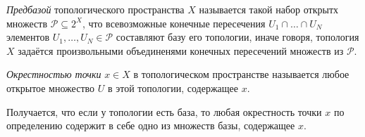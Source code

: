 \begin{to_def}
    \textit{Предбазой} топологического пространства $X$ называется такой набор открытх множеств $\mathcal P \subseteq 2^X$, что всевозможные конечные пересечения $U_1 \cap \ldots \cap U_N$ элементов $U_1, \ldots, U_N \in \mathcal P$ составляют базу его топологии, иначе говоря, топология $X$ задаётся произвольными объединенями конечных пересечений множеств из $\mathcal P$. 
\end{to_def}


\begin{to_def}
    \textit{Окрестностью точки} $x \in X$ в топологическом пространстве называется любое открытое множество $U$ в этой топологии, содержащее $x$. 
\end{to_def}



Получается, что если у топологии есть база, то любая окрестность точки $x$ по определению содержит в себе одно из множеств базы, содержащее $x$. 



